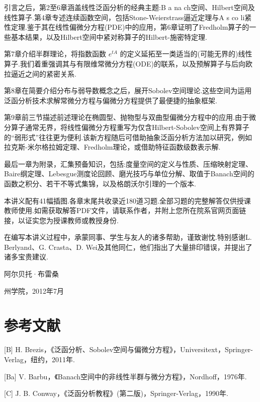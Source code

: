 \documentclass[10pt,b5paper,openany,twoside]{ctexbook}
\begin{document}
引言之后，第2至6章涵盖线性泛函分析的经典主题:B a na ch空间、Hilbert空间及线性算子.第4章专述连续函数空间，包括Stone-Weierstrass逼近定理与A s co li紧性定理.鉴于其在线性偏微分方程(PDE)中的应用，第6章证明了Fredholm算子的一些基本结果，以及Hilbert空间中紧对称算子的Hilbert-施密特定理.

第7章介绍半群理论，将指数函数 ${e}^{tA}$ 的定义延拓至一类适当的(可能无界的)线性算子.我们着重强调其与有限维常微分方程(ODE)的联系，以及预解算子与后向欧拉逼近之间的紧密关系.

第8章在简要介绍分布与弱导数概念之后，展开Sobolev空间理论.这些空间为运用泛函分析技术求解常微分方程与偏微分方程提供了最便捷的抽象框架.

第9章前三节描述前述理论在椭圆型、抛物型与双曲型偏微分方程中的应用.由于微分算子通常无界，将线性偏微分方程重写为仅含Hilbert-Sobolev空间上有界算子的“弱形式”往往更为便利.该新方程随后可借助抽象泛函分析方法加以研究，例如拉克斯-米尔格拉姆定理、Fredholm理论，或借助特征函数级数表示解.

最后一章为附录，汇集预备知识，包括:度量空间的定义与性质、压缩映射定理、Baire纲定理、Lebesgue测度论回顾、磨光技巧与单位分解、取值于Banach空间的函数之积分、若干不等式集锦，以及格朗沃尔引理的一个版本.

本讲义配有41幅插图.各章末尾共收录近180道习题.全部习题的完整解答仅供授课教师使用.如需获取解答PDF文件，请联系作者，并附上您所在院系官网页面链接，以证实您为授课教师或教授身份.

在编写本讲义过程中，承蒙同事、学生与友人的诸多帮助，谨致谢忱.特别感谢L. Berlyand、G. Crasta、D. Wei及其他同仁，他们指出了大量排印错误，并提出了诸多宝贵建议.

阿尔贝托·布雷桑

州学院，2012年7月













\section*{参考文献}

[B] H. Brezis，《泛函分析、Sobolev空间与偏微分方程》，Universitext，Springer-Verlag，纽约，2011年.

[Ba] V. Barbu，《Banach空间中的非线性半群与微分方程》，Nordhoff，1976年.

[C] J. B. Conway，《泛函分析教程》(第二版)，Springer-Verlag，1990年.
\end{document}
